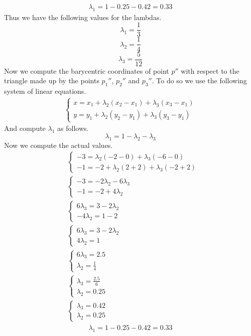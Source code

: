 \documentclass{article}
\begin{document}
\begin{align*}
	\lambda_1 = 1 - 0.25 - 0.42 = 0.33
\end{align*}
Thus we have the following values for the lambdas.
\[ \lambda_1 = \displaystyle \frac{1}{3} \]
\[ \lambda_2 = \displaystyle \frac{1}{4} \]
\[ \lambda_3 = \displaystyle \frac{5}{12} \]
Now we compute the barycentric coordinates of point $p''$ with respect to the triangle made up by the points $p_1''$, $p_2''$ and $p_3''$. To do so we use the following system of linear equations.
\begin{align*}
	\begin{cases} x = x_1 + \lambda_2 (x_2-x_1) + \lambda_3 (x_3-x_1) \\ y = y_1 + \lambda_2 (y_2-y_1) + \lambda_3 (y_3-y_1) \end{cases}
\end{align*}
And compute $\lambda_1$ as follows.
\[ \lambda_1 = 1 - \lambda_2 - \lambda_3 \]
Now we compute the actual values.
\begin{align*}
	& \begin{cases} -3 = \lambda_2(-2-0) + \lambda_3(-6-0) \\ -1 = -2 + \lambda_2(2+2) + \lambda_3(-2+2) \end{cases} \\ 
	& \begin{cases} -3 = -2 \lambda_2 -6 \lambda_3 \\ -1 = -2 +4 \lambda_2 \end{cases} \\ 
	& \begin{cases} 6\lambda_3 = 3 - 2\lambda_2 \\ -4\lambda_2 = 1-2 \end{cases} \\
	& \begin{cases} 6\lambda_3 = 3 - 2\lambda_2 \\ 4\lambda_2 = 1 \end{cases} \\
	& \begin{cases} 6\lambda_3 = 2.5 \\ \lambda_2 = \displaystyle \frac{1}{4} \end{cases} \\
	& \begin{cases} \lambda_3 = \displaystyle \frac{2.5}{6} \\ \lambda_2 = 0.25  \end{cases} \\
	& \begin{cases} \lambda_3 = 0.42 \\ \lambda_2 = 0.25 \end{cases}
\end{align*}
\begin{align*}
	\lambda_1 = 1 - 0.25 - 0.42 = 0.33
\end{align*}
\end{document}
